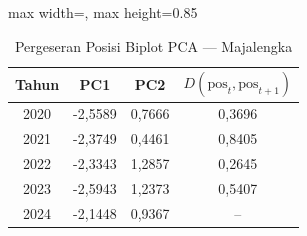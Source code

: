 \begin{table}[H]
\centering
\caption{Pergeseran Posisi Biplot PCA --- Majalengka} \label{tab:appjarak_pca_skor_majalengka}
\begin{adjustbox}{max width=\textwidth, max height=0.85\textheight}
\begin{tabular}{|c|c|c|c|}
\hline
\textbf{Tahun} & \textbf{PC1} & \textbf{PC2} & \textbf{$D(\text{pos}_t, \text{pos}_{t+1})$} \\
\hline
2020 & -2,5589 & 0,7666 & 0,3696 \\
2021 & -2,3749 & 0,4461 & 0,8405 \\
2022 & -2,3343 & 1,2857 & 0,2645 \\
2023 & -2,5943 & 1,2373 & 0,5407 \\
2024 & -2,1448 & 0,9367 & -- \\
\hline
\end{tabular}
\end{adjustbox}
\end{table}